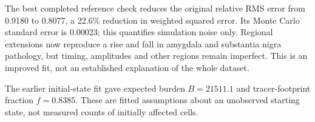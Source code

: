 The best completed reference check reduces the original relative RMS error from 0.9180 to 0.8077, a 22.6\% reduction in weighted squared error. Its Monte Carlo standard error is 0.00023; this quantifies simulation noise only. Regional extensions now reproduce a rise and fall in amygdala and substantia nigra pathology, but timing, amplitudes and other regions remain imperfect. This is an improved fit, not an established explanation of the whole dataset.

The earlier initial-state fit gave expected burden $B=21511.1$ and tracer-footprint fraction $f=0.8385$. These are fitted assumptions about an unobserved starting state, not measured counts of initially affected cells.
